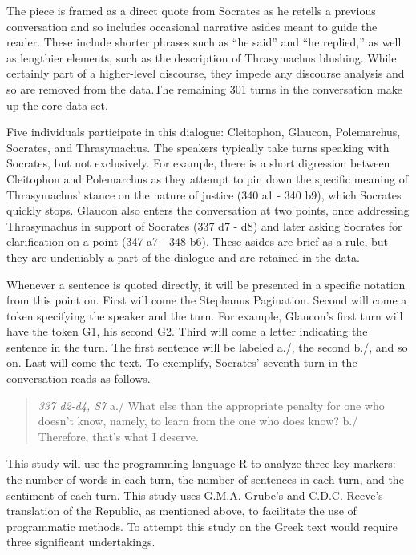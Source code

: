 \documentclass[noraggedright]{turabian-researchpaper}
\begin{document}
The piece is framed as a direct quote from Socrates as he retells a
previous conversation and so includes occasional narrative asides meant to
guide the reader. These include shorter phrases such as ``he said'' and ``he
replied,'' as well as lengthier elements, such as the description of
Thrasymachus blushing. While certainly part of a higher-level discourse, they
impede any discourse analysis and so are removed from the data.The remaining 301
turns in the conversation make up the core data set.

Five individuals participate in this dialogue: Cleitophon, Glaucon, Polemarchus,
Socrates, and Thrasymachus. The speakers typically take turns speaking with
Socrates, but not exclusively. For example, there is a short digression between
Cleitophon and Polemarchus as they attempt to pin down the specific meaning of
Thrasymachus' stance on the nature of justice (340 a1 - 340 b9), which Socrates
quickly stops. Glaucon also enters the conversation at two points, once
addressing Thrasymachus in support of Socrates (337 d7 - d8) and later asking
Socrates for clarification on a point (347 a7 - 348 b6). These asides are brief
as a rule, but they are undeniably a part of the dialogue and are retained in
the data.

Whenever a sentence is quoted directly, it will be presented in a specific
notation from this point on. First will come the Stephanus Pagination. Second
will come a token specifying the speaker and the turn. For example, Glaucon's
first turn will have the token G1, his second G2. Third will come a letter
indicating the sentence in the turn. The first sentence will be
labeled a./, the second b./, and so on. Last will come the text. To exemplify,
Socrates' seventh turn in the conversation reads as follows.

\begin{quote}
\emph{337 d2-d4, S7} a./ What else than the appropriate penalty for one who doesn't
know, namely, to learn from the one who does know? b./ Therefore, that's what
I deserve.
\end{quote}

This study will use the programming language R to analyze three key markers:
the number of words in each turn, the number of sentences in each turn, and the
sentiment of each turn. This study uses G.M.A. Grube's and C.D.C. Reeve's
translation of the Republic, as mentioned above, to facilitate the use of
programmatic methods. To attempt this study on the Greek text would require
three significant undertakings.
\end{document}
